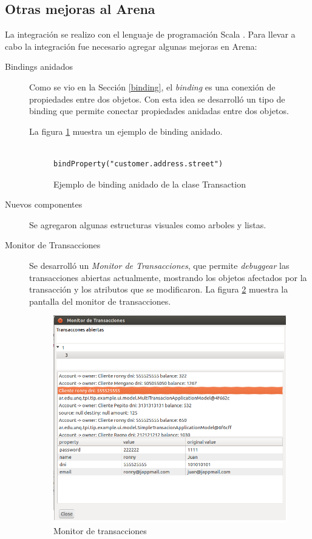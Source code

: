 \subsection{Otras mejoras al Arena}
	La integración se realizo con el lenguaje de programación Scala
	\cite{OderskySpoonVenners08}. Para llevar a cabo la integración fue necesario agregar algunas
	mejoras en Arena:
	\begin{description}

	  \item[Bindings anidados] Como se vio en la Sección \ref{binding},
		  el \emph{binding} es una conexión de propiedades entre dos objetos. Con
		  esta idea se desarrolló un tipo de binding que permite conectar propiedades
		  anidadas entre dos objetos. 
		  
		  La figura \ref{bindAnidado} muestra un ejemplo de binding anidado.

		\begin{figure}[hbt]
			\centering
					\begin{lstlisting}
						bindProperty("customer.address.street") 
					\end{lstlisting}
			\caption{Ejemplo de binding anidado de la clase Transaction}
			\label{bindAnidado}
		\end{figure}	

	  \item[Nuevos componentes] Se agregaron algunas estructuras visuales como
	  arboles y listas.

  	  \item[Monitor de Transacciones]
		 Se desarrolló un \emph{Monitor de Transacciones}, que permite
		 \emph{debuggear} las transacciones abiertas actualmente, mostrando
		 los objetos afectados por la transacción y los atributos que se
		 modificaron.
		La figura \ref{monitor} muestra la pantalla del monitor de transacciones.
		
		\begin{figure}[hbt]
			\centering
			\includegraphics[scale=0.5]{img/monitorTransacciones.png}
			\caption{Monitor de transacciones}
			\label{monitor}
		\end{figure}	
	\end{description}
